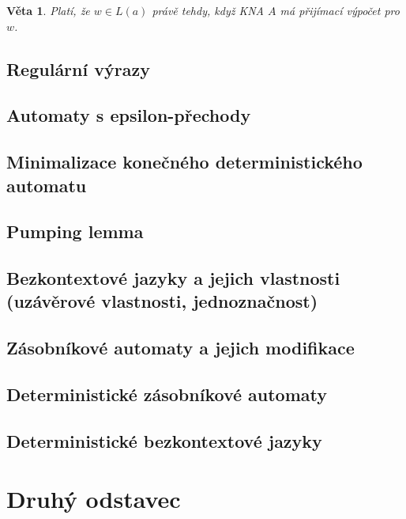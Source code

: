 \documentclass[10pt,a4paper]{article}
\theoremstyle{note}
\newtheorem{veta}{Věta}
\begin{document}
\begin{veta}
Platí, že $w \in L(a)$ právě tehdy, když KNA $A$ má přijímací výpočet pro $w$.
\end{veta}


	\subsection{Regulární výrazy}

	\subsection{Automaty s epsilon-přechody}

	\subsection{Minimalizace konečného deterministického automatu}

	\subsection{Pumping lemma}

	\subsection{Bezkontextové jazyky a jejich vlastnosti (uzávěrové vlastnosti, jednoznačnost)}

	\subsection{Zásobníkové automaty a jejich modifikace}

	\subsection{Deterministické zásobníkové automaty}

	\subsection{Deterministické bezkontextové jazyky}



\section{Druhý odstavec}
\end{document}

